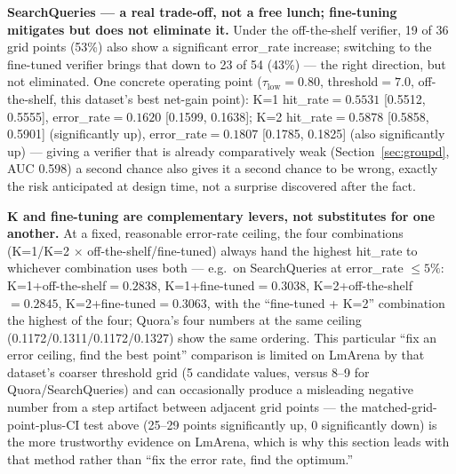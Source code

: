 \documentclass[11pt]{article}
\newcommand{\taulow}{\ensuremath{\tau_{\text{low}}}}
\begin{document}
\textbf{SearchQueries --- a real trade-off, not a free lunch; fine-tuning mitigates but does not eliminate it.} Under the off-the-shelf verifier, 19 of 36 grid points (53\%) also show a significant error\_rate increase; switching to the fine-tuned verifier brings that down to 23 of 54 (43\%) --- the right direction, but not eliminated. One concrete operating point ($\taulow=0.80$, threshold$=7.0$, off-the-shelf, this dataset's best net-gain point): K=1 hit\_rate$=0.5531$ [0.5512, 0.5555], error\_rate$=0.1620$ [0.1599, 0.1638]; K=2 hit\_rate$=0.5878$ [0.5858, 0.5901] (significantly up), error\_rate$=0.1807$ [0.1785, 0.1825] (also significantly up) --- giving a verifier that is already comparatively weak (Section~\ref{sec:groupd}, AUC 0.598) a second chance also gives it a second chance to be wrong, exactly the risk anticipated at design time, not a surprise discovered after the fact.

\textbf{K and fine-tuning are complementary levers, not substitutes for one another.} At a fixed, reasonable error-rate ceiling, the four combinations (K=1/K=2 $\times$ off-the-shelf/fine-tuned) always hand the highest hit\_rate to whichever combination uses both --- e.g.\ on SearchQueries at error\_rate $\le 5\%$: K=1+off-the-shelf$=0.2838$, K=1+fine-tuned$=0.3038$, K=2+off-the-shelf$=0.2845$, K=2+fine-tuned$=0.3063$, with the ``fine-tuned + K=2'' combination the highest of the four; Quora's four numbers at the same ceiling (0.1172/0.1311/0.1172/0.1327) show the same ordering. This particular ``fix an error ceiling, find the best point'' comparison is limited on LmArena by that dataset's coarser threshold grid (5 candidate values, versus 8--9 for Quora/SearchQueries) and can occasionally produce a misleading negative number from a step artifact between adjacent grid points --- the matched-grid-point-plus-CI test above (25--29 points significantly up, 0 significantly down) is the more trustworthy evidence on LmArena, which is why this section leads with that method rather than ``fix the error rate, find the optimum.''
\end{document}
